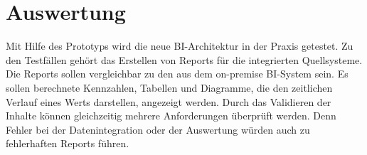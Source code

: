 \section{Auswertung} \label{sec:umsetzung:auswertung}
Mit Hilfe des Prototyps wird die neue BI-Architektur in der Praxis getestet. Zu den Testfällen gehört das Erstellen von Reports für die integrierten Quellsysteme. Die Reports sollen vergleichbar zu den aus dem on-premise BI-System sein. Es sollen berechnete Kennzahlen, Tabellen und Diagramme, die den zeitlichen Verlauf eines Werts darstellen, angezeigt werden. Durch das Validieren der Inhalte können gleichzeitig mehrere Anforderungen überprüft werden. Denn Fehler bei der Datenintegration oder der Auswertung würden auch zu fehlerhaften Reports führen.


